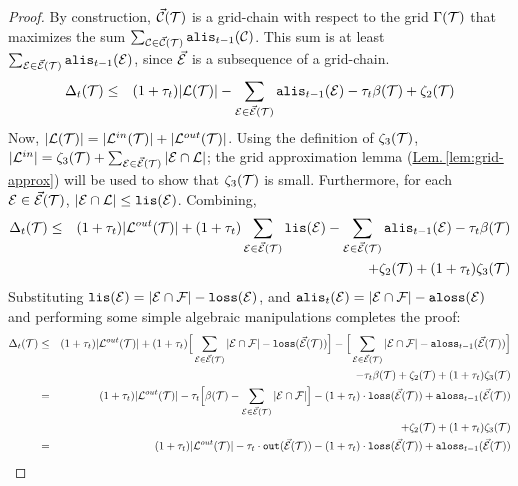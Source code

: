 \documentclass{acmsmall}
\newcommand{\cC}{{\cal C}}
\newcommand{\cE}{{\cal E}}
\newcommand{\cF}{{\cal F}}
\newcommand{\cL}{{\cal L}}
\newcommand{\cT}{{\cal T}}
\newcommand{\Lem}[1]{\hyperref[lem:#1]{Lem.\,\ref*{lem:#1}}} %
\newcommand{\lis}{{\tt lis}}
\newcommand{\loss}{{\tt loss}}
\newcommand{\alis}{{\tt alis}}
\newcommand{\aloss}{{\tt aloss}}
\newcommand{\outside}{{\tt out}}
\newcommand{\kappaest}{\widehat{\kappa}}
\newcommand{\errorterm}{\zeta}
\begin{document}
\begin{proof}
By construction, $\vec{\cC}(\cT)$  is a grid-chain with respect to the grid
$\Gamma(\cT)$ 
that maximizes the sum $\sum_{\cC \in \vec{\cC}(\cT)} \alis_{t-1}(\cC)$.  This sum is at least
$\sum_{\cE \in \vec{\cE}(\cT)} \alis_{t-1}(\cE)$, since $\vec{\cE}$ is a subsequence of a grid-chain.
%
\begin{eqnarray*}
\nonumber
\Delta_t(\cT) & \leq &(1+\tau_t)|\cL(\cT)| - \sum_{\cE \in \vec{\cE}(\cT)} \alis_{t-1}(\cE) - \tau_t \beta(\cT) + \errorterm_2(\cT)
\end{eqnarray*}
%
Now, $|\cL(\cT)|=|\cL^{in}(\cT)|+|\cL^{out}(\cT)|$.  Using the definition of $\errorterm_3(\cT)$,  
$|\cL^{in}|=\errorterm_3(\cT) + \sum_{\cE \in \vec{\cE}(\cT)} |\cE \cap \cL|$;  the grid approximation
lemma (\Lem{grid-approx}) will be used to show that $\errorterm_3(\cT)$ is small.  
Furthermore, for each $\cE \in \vec{\cE}(\cT)$, $|\cE \cap \cL| \leq \lis(\cE)$. Combining,
%
\begin{eqnarray*}
\Delta_t(\cT) & \leq &(1+\tau_t)|\cL^{out}(\cT)| + (1+\tau_t)\sum_{\cE \in \vec{\cE}(\cT)} \lis(\cE)
- \sum_{\cE \in \vec{\cE}(\cT)} \alis_{t-1}(\cE) - \tau_t \beta(\cT) \\
& & + \errorterm_2(\cT)+(1+\tau_t)\errorterm_3(\cT)
%
\end{eqnarray*}
%
Substituting $\lis(\cE) = |\cE \cap \cF|-\loss(\cE)$, and $\alis_t(\cE)=|\cE \cap \cF|-\aloss(\cE)$ and
performing some simple algebraic manipulations completes the proof:
\begin{eqnarray*}
\Delta_t(\cT) & \leq &(1+\tau_t)|\cL^{out}(\cT)| + (1+\tau_t)\Big[\sum_{\cE \in \vec{\cE}(\cT)} |\cE \cap \cF|
- \loss(\vec{\cE}(\cT))\Big]
- \Big[\sum_{\cE \in \vec{\cE}(\cT)} |\cE \cap \cF|-\aloss_{t-1}(\vec{\cE}(\cT))\Big] \\
& & - \tau_t \beta(\cT) + \errorterm_2(\cT)+(1+\tau_t)\errorterm_3(\cT) \\
& = & (1+\tau_t)|\cL^{out}(\cT)| - \tau_t \Big[\beta(\cT) - \sum_{\cE \in \vec{\cE}(\cT)} |\cE \cap \cF|\Big]
- (1+\tau_t) \cdot \loss(\vec{\cE}(\cT)) + \aloss_{t-1}(\vec{\cE}(\cT)) \\
&&+\errorterm_2(\cT)+(1+\tau_t)\errorterm_3(\cT) \\
& = & (1+\tau_t)|\cL^{out}(\cT)| - \tau_t \cdot \outside(\vec{\cE}(\cT))
- (1+\tau_t) \cdot \loss(\vec{\cE}(\cT)) + \aloss_{t-1}(\vec{\cE}(\cT)) \\

\end{eqnarray*}
\end{proof}
\end{document}
